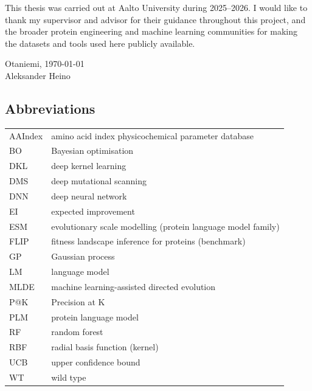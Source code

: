 \documentclass[english, 12pt, a4paper, elec, utf8, a-2b, online]{aaltothesis}
\begin{document}
\newpage
\dothesispagenumbering{}

This thesis was carried out at Aalto University during 2025--2026.
I would like to thank my supervisor and advisor for their guidance throughout this project,
and the broader protein engineering and machine learning communities for making the
datasets and tools used here publicly available.

\vspace{2cm}
Otaniemi, \today\\
{\hfill Aleksander Heino \hspace{1cm}}
\newpage

\thesistableofcontents

\subsection*{Abbreviations}
\begin{tabular}{ll}
  AAIndex & amino acid index physicochemical parameter database \\
  BO      & Bayesian optimisation \\
  DKL     & deep kernel learning \\
  DMS     & deep mutational scanning \\
  DNN     & deep neural network \\
  EI      & expected improvement \\
  ESM     & evolutionary scale modelling (protein language model family) \\
  FLIP    & fitness landscape inference for proteins (benchmark) \\
  GP      & Gaussian process \\
  LM      & language model \\
  MLDE    & machine learning-assisted directed evolution \\
  P@K     & Precision at K \\
  PLM     & protein language model \\
  RF      & random forest \\
  RBF     & radial basis function (kernel) \\
  UCB     & upper confidence bound \\
  WT      & wild type \\
\end{tabular}

\cleardoublepage

\end{document}
